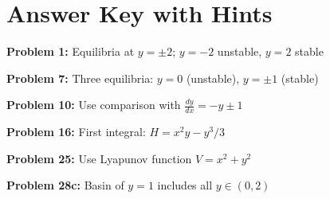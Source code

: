 \documentclass[12pt]{article}
\begin{document}
\section*{Answer Key with Hints}

\textbf{Problem 1:} Equilibria at $y = \pm 2$; $y = -2$ unstable, $y = 2$ stable

\textbf{Problem 7:} Three equilibria: $y = 0$ (unstable), $y = \pm 1$ (stable)

\textbf{Problem 10:} Use comparison with $\frac{dy}{dx} = -y \pm 1$

\textbf{Problem 16:} First integral: $H = x^2y - y^3/3$

\textbf{Problem 25:} Use Lyapunov function $V = x^2 + y^2$

\textbf{Problem 28c:} Basin of $y=1$ includes all $y \in (0,2)$
\end{document}
